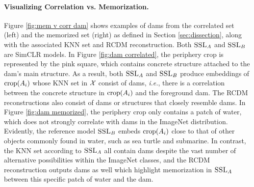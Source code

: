 \label{sec:mem v corr}
\vspace{-0.5em} 
\paragraph{Visualizing Correlation vs. Memorization.}
Figure \ref{fig:mem v corr dam} shows examples of dams from the {\color{part_blue}correlated} set (left) and the {\color{part_orange}memorized} set (right) as defined in Section \ref{sec:dissection}, along with the associated KNN set and RCDM reconstruction. Both $\textsc{SSL}_A$ and $\textsc{SSL}_B$ are SimCLR models. In Figure \ref{fig:dam correlated}, the periphery crop is represented by the pink square, which contains concrete structure attached to the dam's main structure. As a result, both $\textsc{SSL}_A$ and $\textsc{SSL}_B$ produce embeddings of $\mathrm{crop}({A_i})$ whose KNN set in $\mathcal{X}$ consist of dams, \emph{i.e.}, there is a correlation between the concrete structure in $\mathrm{crop}({A_i})$ and the foreground dam. The RCDM reconstructions also consist of dams or structures that closely resemble dams. 
In Figure \ref{fig:dam memorized}, the periphery crop only contains a patch of water, which does not strongly correlate with dams in the ImageNet distribution. Evidently, the reference model $\textsc{SSL}_B$ embeds $\mathrm{crop}({A_i})$ close to that of other objects commonly found in water, such as sea turtle and submarine. In contrast, the KNN set according to $\textsc{SSL}_A$ all contain dams despite the vast number of alternative possibilities within the ImageNet classes, and the RCDM reconstruction outputs dams as well which highlight memorization in $\textsc{SSL}_A$ between this specific patch of water and the dam. %


\vspace{-0.5em} 
